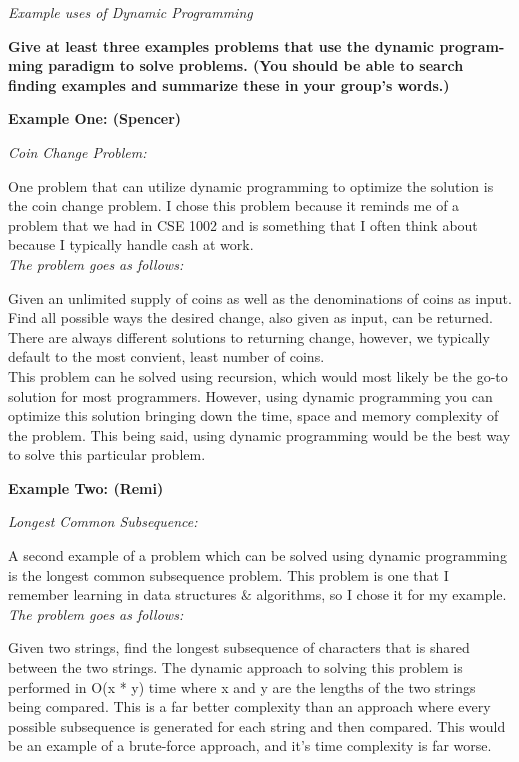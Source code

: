 \documentclass{article}
\begin{document}
\bigskip

\noindent \textit{Example uses of Dynamic Programming}


\textbf{Give at least three examples problems that use the dynamic program-
ming paradigm to solve problems. (You should be able to search
finding examples and summarize these in your group’s words.)}

\bigskip

\noindent \textbf{Example One: (Spencer)}

\noindent \textit{Coin Change Problem:}

One problem that can utilize dynamic programming to optimize the
solution is the coin change problem. I chose this problem because 
it reminds me of a problem that we had in CSE 1002 and is something
that I often think about because I typically handle cash at work.\\

\noindent \textit{The problem goes as follows:}

Given an unlimited supply of coins as well as the denominations of
coins as input. Find all possible ways the desired change, also given 
as input, can be returned. There are always different solutions to
returning change, however, we typically default to the most convient,
least number of coins.\\

This problem can he solved using recursion, which would most likely be
the go-to solution for most programmers. However, using dynamic programming
you can optimize this solution bringing down the time, space and memory
complexity of the problem. This being said, using dynamic programming would
be the best way to solve this particular problem.

\bigskip

\noindent \textbf{Example Two: (Remi)}

\noindent \textit{Longest Common Subsequence:}

A second example of a problem which can be solved using dynamic programming 
is the longest common subsequence problem. This problem is one that I 
remember learning in data structures $\&$ algorithms, so I chose it for my 
example.\\

\noindent \textit{The problem goes as follows:}

Given two strings, find the longest subsequence of characters that is 
shared between the two strings. The dynamic approach to solving this problem
is performed in O(x * y) time where x and y are the lengths of the two 
strings being compared. This is a far better complexity than an approach 
where every possible subsequence is generated for each string and then 
compared. This would be an example of a brute-force approach, and it's time 
complexity is far worse.
\end{document}
